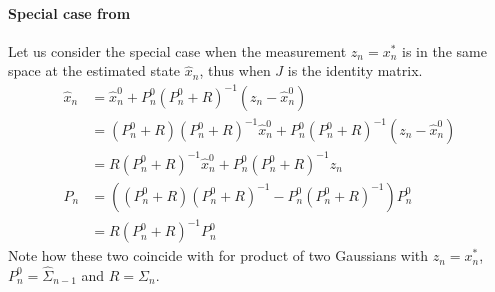 \paragraph{Special case from }
Let us consider the special case when the measurement $z_n = x_n^*$ is in the same space at the estimated state $\hat{x}_n$, thus when $J$ is the identity matrix.
% 
\begin{align*}
\hat{x}_n 
&= \hat{x}_n^0 + P_n^0  (P_n^0 + R)^{-1}(z_n - \hat{x}_n^0) \\
&= (P_n^0 + R)(P_n^0 + R)^{-1}\hat{x}_n^0 + P_n^0  (P_n^0 + R)^{-1}(z_n - \hat{x}_n^0) \\
&= R(P_n^0 + R)^{-1}\hat{x}_n^0 + P_n^0  (P_n^0 + R)^{-1}z_n \\
% 
% 
P_n &= ((P_n^0 + R) (P_n^0 + R)^{-1} - P_n^0  (P_n^0 + R)^{-1}) P_n^0\\
&= R (P_n^0 + R)^{-1} P_n^0
\end{align*}
% 
Note how these two coincide with  for product of two Gaussians  with $z_n = x_n^*$, $P_n^0 = \hat{\Sigma}_{n - 1}$ and $R = \Sigma_{n}$.

